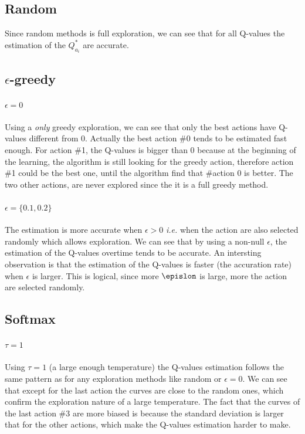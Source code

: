 \documentclass[letterpaper]{article}
\begin{document}
\subsection*{Random}

Since random methods is full exploration, we can see that for all Q-values
the estimation of the $Q^*_{a_i}$ are accurate.


\subsection*{$\epsilon$-greedy}

\paragraph{$\epsilon = 0$} Using a \textit{only} greedy exploration, we
can see that only the best actions have Q-values different from 0. Actually
the best action \#0 tends to be estimated fast enough. For action \#1, the
Q-values is bigger than 0 because at the beginning of the learning, the
algorithm is still looking for the greedy action, therefore action \#1
could be the best one, until the algorithm find that \#action 0 is better.
The two other actions, are never explored since the it is a full greedy
method.

\paragraph{$\epsilon = \{0.1, 0.2\}$}

The estimation is more accurate when $\epsilon > 0$ \textit{i.e.} when
the action are also selected randomly which allows exploration. We can see
that by using a non-null $\epsilon$, the estimation of the Q-values overtime
tends to be accurate. An intersting observation is that the estimation
of the Q-values is faster (the accuration rate)
when $\epsilon$ is larger. This is logical,
since more $\epislon$ is large, more the action are selected randomly.

\subsection*{Softmax}

\paragraph{$\tau = 1$} Using $\tau = 1$ (a large enough temperature)
the Q-values estimation follows the same pattern as for any exploration methods
like random or $\epsilon = 0$. We can see that except for the last action
the curves are close to the random ones,
which confirm the exploration nature of a large temperature.
The fact that the curves of
the last action \#3 are more biased is because the standard deviation
is larger that for the other actions, which make the Q-values estimation
harder to make.
\end{document}
